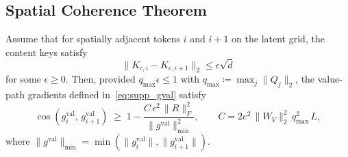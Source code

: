 \subsection{Spatial Coherence Theorem}

\begin{theorem}
\label{thm:spatial}
Assume that for spatially adjacent tokens $i$ and $i{+}1$ on the latent grid,
the content keys satisfy
\begin{equation}
  \|K_{c,i} - K_{c,i+1}\|_2 \leq \epsilon\sqrt{d}
  \label{eq:supp_smooth}
\end{equation}
for some $\epsilon \geq 0$.
Then, provided $q_{\max}\epsilon \leq 1$ with
$q_{\max} \coloneqq \max_j \|Q_j\|_2$, the value-path gradients defined
in~\eqref{eq:supp_gval} satisfy
\begin{equation}
  \cos\!\left(g_i^{\mathrm{val}},\, g_{i+1}^{\mathrm{val}}\right)
  \;\geq\; 1 - \frac{C\,\epsilon^2\,\|R\|_F^2}{\|g^{\mathrm{val}}\|_{\min}^2},
  \qquad
  C = 2e^2\,\|W_V\|_2^2\, q_{\max}^2\, L,
  \label{eq:supp_bound}
\end{equation}
where $\|g^{\mathrm{val}}\|_{\min} = \min(\|g_i^{\mathrm{val}}\|, \|g_{i+1}^{\mathrm{val}}\|)$.
\end{theorem}

